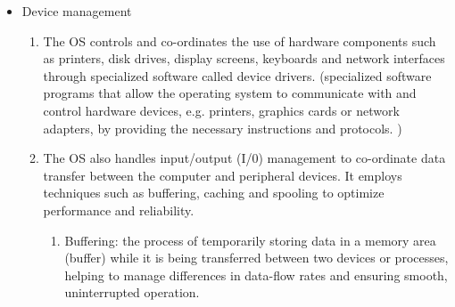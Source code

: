 \begin{itemize}
    \begin{enumerate}
        \item The OS employs a hierarchical file system to organize files in a logical and structured manner. Files are organized into directories (or folders), which can contain further directories, creating a tree-like structure. This organization makes it easier for users and applications to locate and manage data. 
        \item The OS allows a number of set file operations that users and applications can perform on the files and directories, including creating new files and directories; reading and writing data to files; deleting files; renaming files; and moving or copying files and directories to different locations. 
        \item To ensure consistency and avoid conflicts, the OS enforces rules for naming files, ensuring no two files in the same directory have the same name. Files often have extensions, like .jpg or .exe, to indicate the file type and associated application for opening these files.
        \item \textbf{Fragmentation} occurs over time as files are created, modified and deleted, causing them to be scattered across different sectors of the disk. Defragmentation aims to rearrange these file fragments into contiguous sequences, so improving system performance.
    \end{enumerate}
    \item Device management
    \begin{enumerate}
        \item The OS controls and co-ordinates the use of hardware components such as printers, disk drives, display screens, keyboards and network interfaces through specialized software called device drivers. (specialized software programs that allow the operating system to communicate with and control hardware devices, e.g. printers, graphics cards or network adapters, by providing 
the necessary instructions and protocols. )
	\item The OS also handles input/output (I/0) management to co-ordinate data transfer between the computer and peripheral devices. It employs techniques such as buffering, caching and spooling to optimize performance and reliability.
	\begin{enumerate}
	    \item Buffering: the process of temporarily storing data in a memory area (buffer) while it is being transferred between two devices or processes, helping to manage differences in data-flow rates and ensuring smooth, uninterrupted operation.

\end{enumerate}
\end{enumerate}
\end{itemize}
